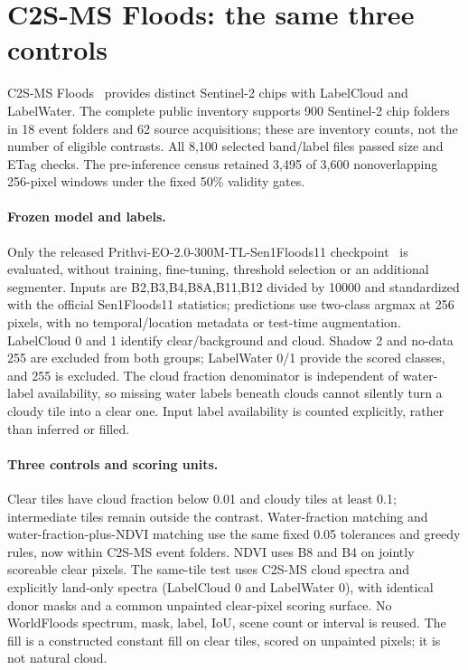 \section{C2S-MS Floods: the same three controls}
\label{sec:c2sms}
C2S-MS Floods~\cite{c2sms} provides distinct Sentinel-2 chips with LabelCloud and LabelWater.
The complete public inventory supports 900 Sentinel-2 chip folders in 18 event folders and 62 source acquisitions; these are inventory counts, not the number of eligible contrasts.
All 8,100 selected band/label files passed size and ETag checks.
The pre-inference census retained 3,495 of 3,600 nonoverlapping 256-pixel windows under the fixed 50\% validity gates.

\paragraph{Frozen model and labels.}
Only the released Prithvi-EO-2.0-300M-TL-Sen1Floods11 checkpoint~\cite{prithvi} is evaluated, without training, fine-tuning, threshold selection or an additional segmenter.
Inputs are B2,B3,B4,B8A,B11,B12 divided by 10000 and standardized with the official Sen1Floods11 statistics; predictions use two-class argmax at 256 pixels, with no temporal/location metadata or test-time augmentation.
LabelCloud 0 and 1 identify clear/background and cloud.
Shadow 2 and no-data 255 are excluded from both groups; LabelWater 0/1 provide the scored classes, and 255 is excluded.
The cloud fraction denominator is independent of water-label availability, so missing water labels beneath clouds cannot silently turn a cloudy tile into a clear one.
Input label availability is counted explicitly, rather than inferred or filled.

\paragraph{Three controls and scoring units.}
Clear tiles have cloud fraction below 0.01 and cloudy tiles at least 0.1; intermediate tiles remain outside the contrast.
Water-fraction matching and water-fraction-plus-NDVI matching use the same fixed 0.05 tolerances and greedy rules, now within C2S-MS event folders.
NDVI uses B8 and B4 on jointly scoreable clear pixels.
The same-tile test uses C2S-MS cloud spectra and explicitly land-only spectra (LabelCloud 0 and LabelWater 0), with identical donor masks and a common unpainted clear-pixel scoring surface.
No WorldFloods spectrum, mask, label, IoU, scene count or interval is reused.
The fill is a constructed constant fill on clear tiles, scored on unpainted pixels; it is not natural cloud.

